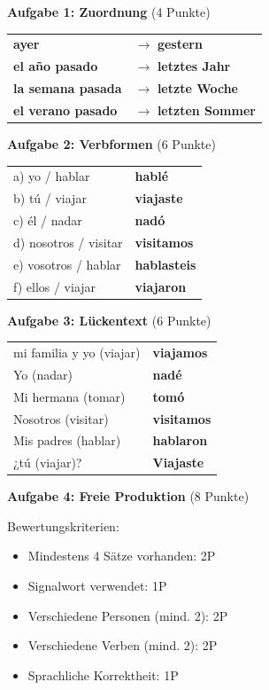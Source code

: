 \documentclass[11pt, a4paper]{article}
\newcommand{\fachfarbe}{spanisch}
\newcommand{\loesung}[1]{\textcolor{loesung}{\textbf{#1}}}
\newcommand{\es}[1]{\textcolor{\fachfarbe}{\textbf{#1}}}
\begin{document}
\vspace{1em}

\textbf{Aufgabe 1: Zuordnung} (4 Punkte)

\begin{tabular}{ll}
\es{ayer} & $\rightarrow$ \loesung{gestern} \\
\es{el año pasado} & $\rightarrow$ \loesung{letztes Jahr} \\
\es{la semana pasada} & $\rightarrow$ \loesung{letzte Woche} \\
\es{el verano pasado} & $\rightarrow$ \loesung{letzten Sommer} \\
\end{tabular}

\vspace{1em}

\textbf{Aufgabe 2: Verbformen} (6 Punkte)

\begin{tabular}{ll}
a) yo / hablar & \loesung{hablé} \\
b) tú / viajar & \loesung{viajaste} \\
c) él / nadar & \loesung{nadó} \\
d) nosotros / visitar & \loesung{visitamos} \\
e) vosotros / hablar & \loesung{hablasteis} \\
f) ellos / viajar & \loesung{viajaron} \\
\end{tabular}

\vspace{1em}

\textbf{Aufgabe 3: Lückentext} (6 Punkte)

\begin{tabular}{ll}
mi familia y yo (viajar) & \loesung{viajamos} \\
Yo (nadar) & \loesung{nadé} \\
Mi hermana (tomar) & \loesung{tomó} \\
Nosotros (visitar) & \loesung{visitamos} \\
Mis padres (hablar) & \loesung{hablaron} \\
¿tú (viajar)? & \loesung{Viajaste} \\
\end{tabular}

\vspace{1em}

\textbf{Aufgabe 4: Freie Produktion} (8 Punkte)

Bewertungskriterien:
\begin{itemize}
    \item Mindestens 4 Sätze vorhanden: 2P
    \item Signalwort verwendet: 1P
    \item Verschiedene Personen (mind. 2): 2P
    \item Verschiedene Verben (mind. 2): 2P
    \item Sprachliche Korrektheit: 1P
\end{itemize}
\end{document}
